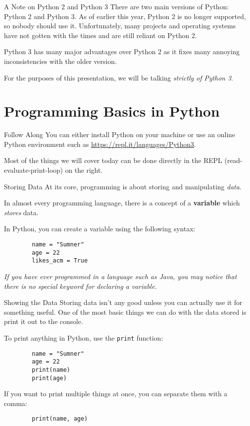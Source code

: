\documentclass{acm}
\begin{document}
\begin{frame}{A Note on Python 2 and Python 3}
    There are two main versions of Python: Python 2 and Python 3. As of earlier
    this year, Python 2 is no longer supported, so nobody should use it.
    Unfortunately, many projects and operating systems have not gotten with the
    times and are still reliant on Python 2.

    \pause
    Python 3 has many major advantages over Python 2 as it fixes many annoying
    inconsistencies with the older version.

    \pause
    For the purposes of this presentation, we will be talking \emph{strictly of
    Python 3}.
\end{frame}

\section{Programming Basics in Python}

\begin{frame}{Follow Along}
    You can either install Python on your machine or use an online Python
    environment such as \url{https://repl.it/languages/Python3}.

    Most of the things we will cover today can be done directly in the REPL
    (read-evaluate-print-loop) on the right.
\end{frame}

\begin{frame}[fragile]{Storing Data}
    At its core, programming is about storing and manipulating \textit{data}.

    \pause
    In almost every programming language, there is a concept of a
    \textbf{variable} which \textit{stores} data.

    \pause
    In Python, you can create a variable using the following syntax:
    \begin{verbatim}
        name = "Sumner"
        age = 22
        likes_acm = True
    \end{verbatim}

    \textit{If you have ever programmed in a language such as Java, you may
    notice that there is no special keyword for declaring a variable.}
\end{frame}

\begin{frame}[fragile]{Showing the Data}
    Storing data isn't any good unless you can actually use it for something
    useful. \pause One of the most basic things we can do with the data stored
    is print it out to the console.

    To print anything in Python, use the \texttt{print} function:
    \begin{verbatim}
        name = "Sumner"
        age = 22
        print(name)
        print(age)
    \end{verbatim}

    \pause
    If you want to print multiple things at once, you can separate them with a
    comma:
    \begin{verbatim}
        print(name, age)
    \end{verbatim}
\end{frame}
\end{document}
